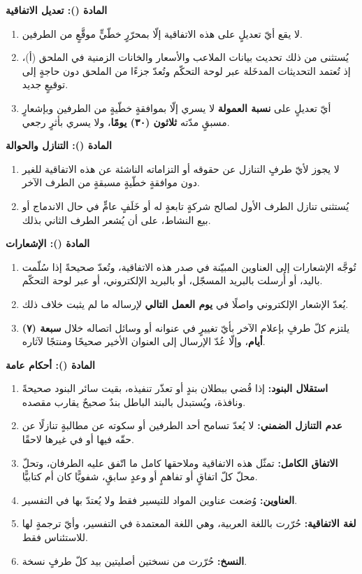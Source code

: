 \documentclass[12pt,a4paper]{article}
\newcounter{bndc}
\newcommand{\bnd}[1]{%
  \vspace{10pt}\par\noindent
  {\color{teal}\bfseries\large المادة (\arabic{bndc}): #1}%
  \stepcounter{bndc}%
  \par\vspace{2pt}\noindent{\color{rule}\rule{\linewidth}{0.6pt}}\par\vspace{4pt}%
}
\newcommand{\mlh}[1]{{\bfseries #1}}
\newenvironment{bnditems}
  {\begin{enumerate}[label=\arabic{bndc}.\arabic*,leftmargin=1.6em,itemsep=3pt,topsep=3pt]}
  {\end{enumerate}}
\begin{document}
\bnd{تعديل الاتفاقية}\label{art:amend}
\begin{bnditems}
  \item لا يقع أيّ تعديلٍ على هذه الاتفاقية إلّا بمحرّرٍ خطّيٍّ موقَّعٍ من الطرفين.
  \item يُستثنى من ذلك تحديث بيانات الملاعب والأسعار والخانات الزمنية في الملحق (أ)، إذ تُعتمد التحديثات المدخَلة عبر لوحة التحكّم وتُعدّ جزءًا من الملحق دون حاجةٍ إلى توقيعٍ جديد.
  \item أيّ تعديلٍ على \mlh{نسبة العمولة} لا يسري إلّا بموافقةٍ خطّيةٍ من الطرفين وبإشعارٍ مسبقٍ مدّته \mlh{ثلاثون (٣٠) يومًا}، ولا يسري بأثرٍ رجعي.
\end{bnditems}

\bnd{التنازل والحوالة}
\begin{bnditems}
  \item لا يجوز لأيّ طرفٍ التنازل عن حقوقه أو التزاماته الناشئة عن هذه الاتفاقية للغير دون موافقةٍ خطّيةٍ مسبقةٍ من الطرف الآخر.
  \item يُستثنى تنازل الطرف الأول لصالح شركةٍ تابعةٍ له أو خَلَفٍ عامٍّ في حال الاندماج أو بيع النشاط، على أن يُشعر الطرف الثاني بذلك.
\end{bnditems}

\bnd{الإشعارات}
\begin{bnditems}
  \item تُوجَّه الإشعارات إلى العناوين المبيّنة في صدر هذه الاتفاقية، وتُعدّ صحيحةً إذا سُلّمت باليد، أو أُرسلت بالبريد المسجّل، أو بالبريد الإلكتروني، أو عبر لوحة التحكّم.
  \item يُعدّ الإشعار الإلكتروني واصلًا في \mlh{يوم العمل التالي} لإرساله ما لم يثبت خلاف ذلك.
  \item يلتزم كلّ طرفٍ بإعلام الآخر بأيّ تغييرٍ في عنوانه أو وسائل اتصاله خلال \mlh{سبعة (٧) أيام}، وإلّا عُدّ الإرسال إلى العنوان الأخير صحيحًا ومنتجًا لآثاره.
\end{bnditems}

\bnd{أحكام عامة}
\begin{bnditems}
  \item \mlh{استقلال البنود:} إذا قُضي ببطلان بندٍ أو تعذّر تنفيذه، بقيت سائر البنود صحيحةً ونافذة، ويُستبدل بالبند الباطل بندٌ صحيحٌ يقارب مقصده.
  \item \mlh{عدم التنازل الضمني:} لا يُعدّ تسامح أحد الطرفين أو سكوته عن مطالبةٍ تنازلًا عن حقّه فيها أو في غيرها لاحقًا.
  \item \mlh{الاتفاق الكامل:} تمثّل هذه الاتفاقية وملاحقها كامل ما اتّفق عليه الطرفان، وتحلّ محلّ كلّ اتفاقٍ أو تفاهمٍ أو وعدٍ سابقٍ، شفويًّا كان أم كتابيًّا.
  \item \mlh{العناوين:} وُضعت عناوين المواد للتيسير فقط ولا يُعتدّ بها في التفسير.
  \item \mlh{لغة الاتفاقية:} حُرّرت باللغة العربية، وهي اللغة المعتمدة في التفسير، وأيّ ترجمةٍ لها للاستئناس فقط.
  \item \mlh{النسخ:} حُرّرت من نسختين أصليتين بيد كلّ طرفٍ نسخة.
\end{bnditems}
\end{document}
